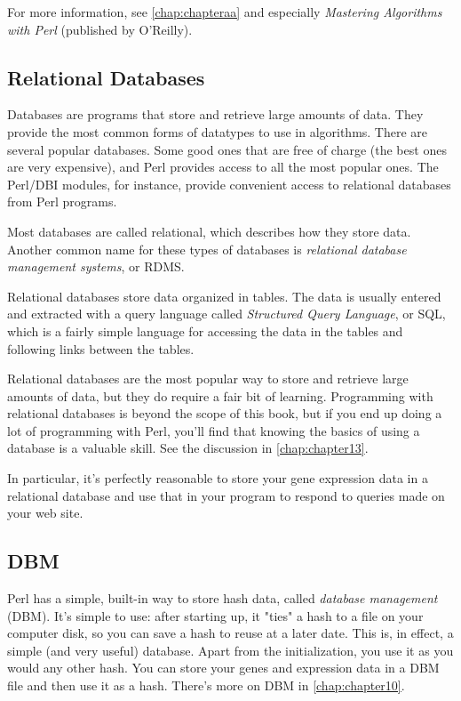 For more information, see \autoref{chap:chapteraa} and especially \textit{Mastering Algorithms with Perl} (published by O'Reilly). 

\subsection{Relational Databases}
Databases are programs that store and retrieve large amounts of data. They provide the most common forms of datatypes to use in algorithms. There are several popular databases. Some good ones that are free of charge (the best ones are very expensive), and Perl provides access to all the most popular ones. The Perl/DBI modules, for instance, provide convenient access to relational databases from Perl programs.

Most databases are called relational, which describes how they store data. Another common name for these types of databases is \textit{relational database management systems}, or RDMS. 

Relational databases store data organized in tables. The data is usually entered and extracted with a query language called \textit{Structured Query Language}, or SQL, which is a fairly simple language for accessing the data in the tables and following links between the tables.

Relational databases are the most popular way to store and retrieve large amounts of data, but they do require a fair bit of learning. Programming with relational databases is beyond the scope of this book, but if you end up doing a lot of programming with Perl, you'll find that knowing the basics of using a database is a valuable skill. See the discussion in \autoref{chap:chapter13}.

In particular, it's perfectly reasonable to store your gene expression data in a relational database and use that in your program to respond to queries made on your web site. 

\subsection{DBM}
Perl has a simple, built-in way to store hash data, called \textit{database management} (DBM). It's simple to use: after starting up, it "ties" a hash to a file on your computer disk, so you can save a hash to reuse at a later date. This is, in effect, a simple (and very useful) database. Apart from the initialization, you use it as you would any other hash. You can store your genes and expression data in a DBM file and then use it as a hash. There's more on DBM in \autoref{chap:chapter10}.

